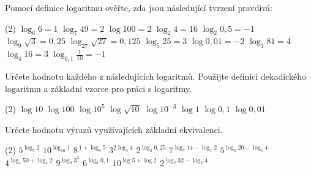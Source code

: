 

\exercisepart
\setcounter{section}{1}

\begin{exercise}
    Pomocí definice logaritmu ověřte, zda jsou následující tvrzení pravdivá:
    \begin{tasks}(2)
        \task $\log_6 6 = 1$
        \task $\log_7 49 = 2$
        \task $\log 100 = 2$
        \task $\log_2 4 = 16$
        \task $\log_2 0{,}5 = -1$
        \task $\log_9 \sqrt{3} = 0{,}25$
        \task $\log_{27} \sqrt{27} = 0{,}125$
        \task $\log_5 25 = 3$
        \task $\log 0{,}01 = -2$
        \task $\log_3 81 = 4$
        \task $\log_4 16 = 3$
        \task $\log_{0{,}1} \frac{1}{10} = -1$
    \end{tasks}
\end{exercise}


\begin{exercise}
    Určete hodnotu každého z následujících logaritmů. Použijte definici dekadického logaritmu
    a základní vzorce pro práci s logaritmy.
    \begin{tasks}(2)
        \task $\log 10$
        \task $\log 100$
        \task $\log 10^{5}$
        \task $\log \sqrt{10}$
        \task $\log 10^{-3}$
        \task $\log 1$
        \task $\log 0{,}1$
        \task $\log 0{,}01$
    \end{tasks}
\end{exercise}


\begin{exercise}
    Určete hodnotu výrazů využívajících základní ekvivalenci.
    \begin{tasks}(2)
        \task $5^{\log_5 2}$
        \task $10^{\log_{10} 1}$
        \task $8^{\,1+\log_{8} 5}$
        \task $3^{2\log_{3} 4}$
        \task $2^{\log_{2} 0{,}25}$
        \task $7^{\log_{7} 14 - \log_{7} 2}$
        \task $5^{\log_{5} 20 - \log_{5} 4}$
        \task $4^{\log_{4} 50 + \log_{4} 2}$
        \task $9^{\log_{9} 3^{3}}$
        \task $6^{\log_{6} 0{,}1}$
        \task $10^{\log 5 + \log 2}$
        \task $2^{\log_2 32 - \log_2 4}$
    \end{tasks}
\end{exercise}


